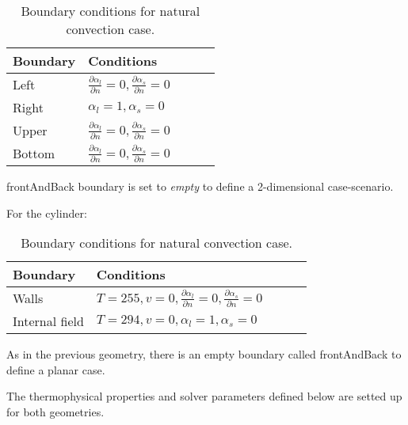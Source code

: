 \begin{table}[h!]
	\begin{tabular}{@{}lllll@{}}
		\toprule[1pt]
		\textbf{Boundary} & \textbf{Conditions}  \\ \midrule[2pt]
		Left & $\frac{\partial \alpha_{l}}{\partial n} = 0, \frac{\partial \alpha_{s}}{\partial n} = 0    $  \\
		Right & $\alpha_{l} = 1, \alpha_{s} = 0 $ \\
		Upper & $\frac{\partial \alpha_{l}}{\partial n} = 0, \frac{\partial \alpha_{s}}{\partial n} = 0$  \\
		Bottom & $\frac{\partial \alpha_{l}}{\partial n} = 0, \frac{\partial \alpha_{s}}{\partial n} = 0 $  \\ \bottomrule[1pt]		
	\end{tabular}
	\centering
	\caption{Boundary conditions for natural convection case.}	
	\label{3.8tab}
\end{table}

\noindent frontAndBack boundary is set to \textit{empty} to define a 2-dimensional case-scenario. 

For the cylinder:
\begin{table}[h!]
	\begin{tabular}{@{}lllll@{}}
		\toprule[1pt]
		\textbf{Boundary} & \textbf{Conditions}  \\ \midrule[2pt]
		Walls & $T=255, v = 0,\frac{\partial \alpha_{l}}{\partial n} = 0, \frac{\partial \alpha_{s}}{\partial n} = 0    $  \\
		Internal field & $T=294, v = 0, \alpha_{l} = 1, \alpha_{s} = 0 $ \\
		\bottomrule[1pt]		
	\end{tabular}
	\centering
	\caption{Boundary conditions for natural convection case.}	
	\label{3.9tab}
\end{table}

\noindent As in the previous geometry, there is an empty boundary called frontAndBack to define a planar case.

\noindent The thermophysical properties and solver parameters defined below are setted up for both geometries.
\clearpage
